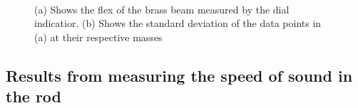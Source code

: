 \documentclass[%
 reprint,
 amsmath,amssymb,
 aps,
]{revtex4-1}
\begin{document}
    \begin{figure}[h!]
      \centering
       \\
      \center
      \caption{(a) Shows the flex of the brass beam measured by the dial indicatior. (b) Shows the standard deviation of the data points in (a) at their respective masses}
      \label{fig:exp_1}
    \end{figure}

  \subsection{Results from measuring the speed of sound in the rod}
\end{document}
